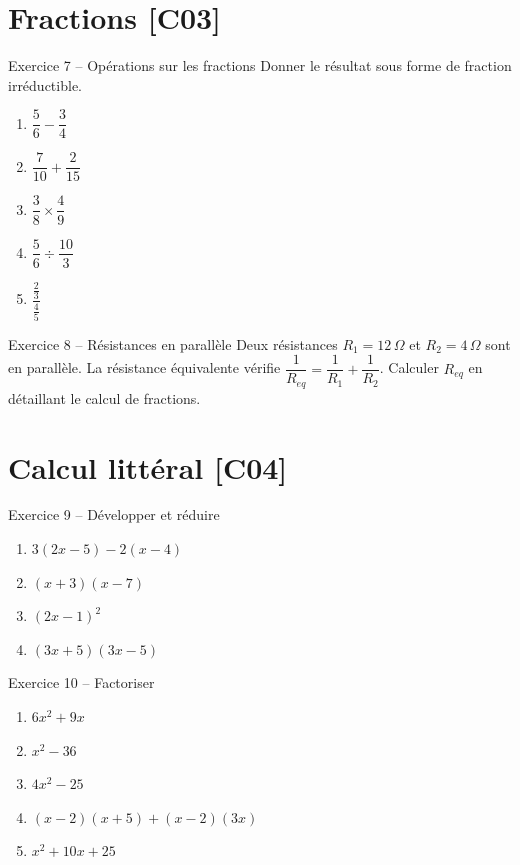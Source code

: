 \documentclass[a4paper,11pt]{article}
\begin{document}
\section{Fractions \hfill {\normalsize\color{uimmred}[C03]}}

\begin{exo}{Exercice 7 -- Opérations sur les fractions}
Donner le résultat sous forme de fraction irréductible.
\begin{enumerate}[label=\alph*)]
  \item $\dfrac{5}{6} - \dfrac{3}{4}$
  \item $\dfrac{7}{10} + \dfrac{2}{15}$
  \item $\dfrac{3}{8} \times \dfrac{4}{9}$
  \item $\dfrac{5}{6} \div \dfrac{10}{3}$
  \item $\dfrac{\frac{2}{3}}{\frac{4}{5}}$
\end{enumerate}
\end{exo}

\begin{exo}{Exercice 8 -- Résistances en parallèle}
Deux résistances $R_1 = 12\,\Omega$ et $R_2 = 4\,\Omega$ sont en parallèle. La résistance équivalente vérifie $\dfrac{1}{R_{eq}} = \dfrac{1}{R_1} + \dfrac{1}{R_2}$. Calculer $R_{eq}$ en détaillant le calcul de fractions.
\end{exo}

\section{Calcul littéral \hfill {\normalsize\color{uimmred}[C04]}}

\begin{exo}{Exercice 9 -- Développer et réduire}
\begin{enumerate}[label=\alph*)]
  \item $3(2x - 5) - 2(x - 4)$
  \item $(x + 3)(x - 7)$
  \item $(2x - 1)^2$
  \item $(3x + 5)(3x - 5)$
\end{enumerate}
\end{exo}

\begin{exo}{Exercice 10 -- Factoriser}
\begin{enumerate}[label=\alph*)]
  \item $6x^2 + 9x$
  \item $x^2 - 36$
  \item $4x^2 - 25$
  \item $(x - 2)(x + 5) + (x - 2)(3x)$
  \item $x^2 + 10x + 25$
\end{enumerate}
\end{exo}
\end{document}
